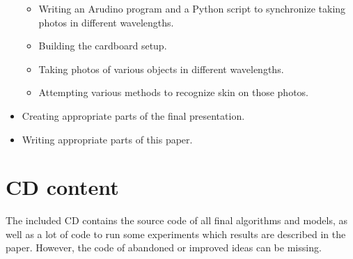 \begin{itemize}
\begin{itemize}
                \item Writing an Arudino program and a Python script to synchronize
                taking photos in different wavelengths.
                \item Building the cardboard setup.
                \item Taking photos of various objects in different wavelengths.
                \item Attempting various methods to recognize skin on those photos.
            \end{itemize}
            \item Creating appropriate parts of the final presentation.
            \item Writing appropriate parts of this paper.
        \end{itemize}

\chapter{CD content}
    The included CD contains the source code of all final algorithms
    and models, as well as a lot of code to run some experiments
    which results are described in the paper.
    However, the code of abandoned or improved ideas can be missing.

